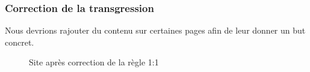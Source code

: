 \documentclass{article}[12pt]
\begin{document}
    \subsubsection*{Correction de la transgression}
    Nous devrions rajouter du contenu sur certaines pages afin de leur donner un but concret.
    \begin{figure}[H]
    	\centering
        \caption{Site après correction de la règle 1:1}
    \end{figure}

     
\end{document}
